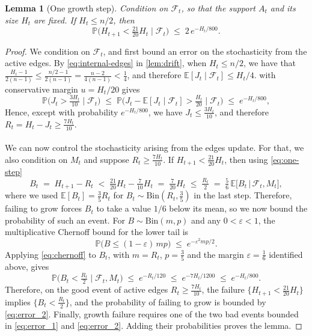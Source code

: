 \documentclass[
    aps,
    superscriptaddress,
    onecolumn,
    10pt,
    prx,
    nofootinbib
]{revtex4-2}
\newtheorem{lemma}{Lemma}
\theoremstyle{namedstatement}
\theoremstyle{plain}
\begin{document}
\begin{lemma}[One growth step]\label{lem:growthstep}
Condition on $\mathcal F_t$, so that the support $A_t$ and its size $H_t$ are fixed.
If $H_t \le n/2$, then
\[
  \mathbb P\Big(H_{t+1}<\tfrac{21}{20}H_t\;\Big|\;\mathcal F_t\Big)\;\le\;2\,e^{-H_t/800}.
\]
\end{lemma}
\begin{proof}
We condition on $\mathcal F_t$, and first bound an error on the stochasticity from the active edges. By \cref{eq:internal-edges} in \cref{lem:drift}, when $H_t\le n/2$, we have that $\frac{H_t - 1}{2(n-1)} \leq \frac{n/2 - 1}{2(n-1)} = \frac{n-2}{4(n-1)} < \frac{1}{4}$, and therefore $\mathbb E[J_t\mid\mathcal F_t]\le H_t/4$.  with conservative margin $u=H_t/20$ gives
\begin{equation}
\label{eq:error_1}
  \mathbb P\Big(J_t>\tfrac{3H_t}{10}\;\Big|\;\mathcal F_t\Big)
  \;\le\;\mathbb P\Big(J_t-\mathbb E[J_t\mid\mathcal F_t]>\tfrac {H_t}{20}\;\Big|\;\mathcal F_t\Big)
  \;\le\;e^{-H_t/800},
\end{equation}
Hence, except with probability $e^{-H_t/800}$, we have $J_t \le \tfrac{3H_t}{10}$,
and therefore $R_t = H_t - J_t \ge \tfrac{7H_t}{10}$.
\\
\\
We can now control the stochasticity arising from the edges update. For that, we also condition on $M_t$ and suppose $R_t\ge\tfrac{7H_t}{10}$. If $H_{t+1}<\tfrac{21}{20}H_t$, then using \cref{eq:one-step}
\begin{equation}
  B_t\;=\;H_{t+1} - R_t\;<\;\tfrac{21}{20}H_t-\tfrac{7}{10}H_t\;=\;\tfrac{7}{20}H_t\;\le\;\tfrac {R_t}{2}\;=\;\tfrac56\,\mathbb E\big[B_t\,\big|\,\mathcal F_t,M_t\big],
\end{equation}
where we used $\mathbb{E}[B_t]=\frac{3}{5}R_t$ for $B_t \sim \mathrm{Bin}\!\left(R_t , \tfrac{3}{5}\right)$ in the last step. Therefore, failing to grow forces $B_t$ to take a value $1/6$ below its mean, so we now bound the probability of such an event. For $B \sim \mathrm{Bin}(m,p)$ and any $0<\varepsilon<1$, the multiplicative Chernoff
bound for the lower tail is
\begin{equation}\label{eq:chernoff}
  \mathbb P\big(B \le (1-\varepsilon)\, mp\big) \;\le\; e^{-\varepsilon^2 mp/2}.
\end{equation}
Applying \cref{eq:chernoff} to $B_t$, with $m = R_t$, $p = \tfrac35$ and the margin
$\varepsilon=\tfrac16$ identified above, gives
\begin{equation}\label{eq:error_2}
  \mathbb P\Big(B_t<\tfrac{R_t}{2}\;\Big|\;\mathcal F_t,M_t\Big)
  \;\le\;e^{-R_t/120}\;\le\;e^{-7H_t/1200}\;\le\;e^{-H_t/800}.
\end{equation}
Therefore, on the good event of active edges $R_t \ge \tfrac{7H_t}{10}$, the
failure $\{H_{t+1}<\tfrac{21}{20}H_t\}$ implies $\{B_t<\tfrac{R_t}{2}\}$, and the probability of failing to grow is bounded by \cref{eq:error_2}. Finally, growth failure requires one of the two bad events bounded in \cref{eq:error_1} and \cref{eq:error_2}. Adding their probabilities proves the lemma.
\end{proof}
\end{document}
